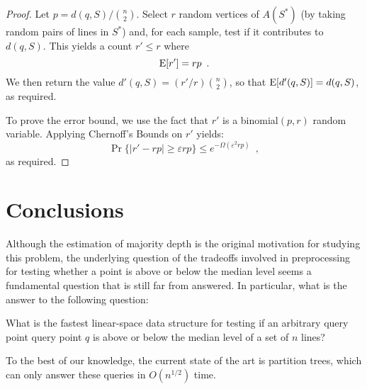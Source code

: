 \documentclass{patmorin}
\newcommand{\eps}{\varepsilon}
\begin{document}
\begin{proof}
  Let $p=d(q,S)/\binom{n}{2}$.
  Select $r$ random vertices of $A(S^*)$ (by taking random pairs of lines
  in $S^*$) and, for each sample, test if it contributes to $d(q,S)$.  This
  yields a count $r' \le r$ where
  \[ 
     \mathrm{E}[r'] = rp \enspace .
  \]
  We then return the value $d'(q,S)=(r'/r)\binom{n}{2}$, so that
  $\mathrm{E}[d'(q,S)]=d(q,S)$, as required.

  To prove the error bound, we use the fact that $r'$ is a binomial$(p,r)$ random variable.  Applying Chernoff's Bounds on $r'$ yields:
  \[
     \Pr\{|r' - rp| \ge \eps rp\} \le e^{-\Omega(\eps^2rp)} \enspace ,
  \]
  as required.
\end{proof}

\section{Conclusions}

Although the estimation of majority depth is the original motivation for
studying this problem, the underlying question of the tradeoffs involved
in preprocessing for testing whether a point is above or below the median
level seems a fundamental question that is still far from answered.  In particular, what is the answer to the following question:

\begin{op}
What is the fastest linear-space data structure for testing if an
arbitrary query point query point $q$ is above or below the median level
of a set of $n$ lines?
\end{op}

To the best of our knowledge, the current state of the art is partition
trees, which can only answer these queries in $O(n^{1/2})$ time.



\end{document}
